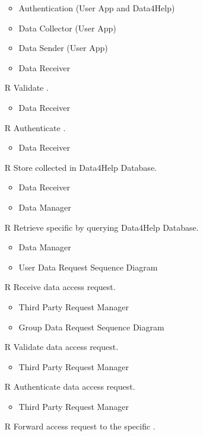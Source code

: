 \begin{itemize}
\begin{itemize}
		\item Authentication (User App and Data4Help)
		\item Data Collector (User App)
		\item Data Sender (User App)
		\item Data Receiver
	\end{itemize}
	\item[R\subs{9}]Validate .
	\begin{itemize}
		\item Data Receiver
	\end{itemize}
	\item[R\subs{10}]Authenticate .
	\begin{itemize}
		\item Data Receiver
	\end{itemize}
	\item[R\subs{11}]Store collected  in Data4Help Database.
	\begin{itemize}
		\item Data Receiver
		\item Data Manager
	\end{itemize}
	\item[R\subs{12}]Retrieve specific  by querying Data4Help Database.
	\begin{itemize}
		\item Data Manager
		\item User Data Request Sequence Diagram
	\end{itemize}
	\item[R\subs{13}]Receive  data access request.
	\begin{itemize}
		\item Third Party Request Manager
		\item Group Data Request Sequence Diagram
	\end{itemize}
	\item[R\subs{14}]Validate  data access request.
	\begin{itemize}
		\item Third Party Request Manager
	\end{itemize}
	\item[R\subs{15}]Authenticate  data access request.
	\begin{itemize}
		\item Third Party Request Manager
	\end{itemize}
	\item[R\subs{16}]Forward  access request to the specific .

\end{itemize}
